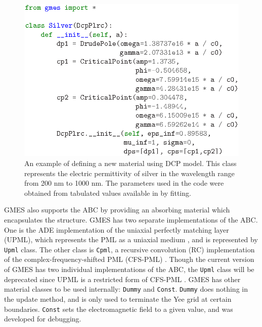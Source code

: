 \begin{figure}[Hp!]
  \centering
  \includegraphics[keepaspectratio=true]{figure/silver}
  \caption{An example of defining a new material using DCP model. This class represents the electric permittivity of silver in the wavelength range from 200 nm to 1000 nm. The parameters used in the code were obtained from tabulated values available in \citet{johnson_optical_1972} by fitting.}
  \label{fig:silver}
\end{figure}

GMES also supports the ABC by providing an absorbing material which encapsulates the structure. GMES has two separate implementations of the ABC. One is the ADE implementation of the uniaxial perfectly matching layer (UPML), which represents the PML as a uniaxial medium \cite{gedney_anisotropic_1996}, and is represented by \texttt{Upml} class. The other class is \texttt{Cpml}, a recursive convolution (RC) implementation of the complex-frequency-shifted PML (CFS-PML) \cite{roden_convolution_2000}. Though the current version of GMES has two individual implementations of the ABC, the \texttt{Upml} class will be deprecated since UPML is a restricted form of CFS-PML \cite{taflove_computational_2005}. GMES has other material classes to be used internally: \texttt{Dummy} and \texttt{Const}. \texttt{Dummy} does nothing in the update method, and is only used to terminate the Yee grid at certain boundaries. \texttt{Const} sets the electromagnetic field to a given value, and was developed for debugging.

